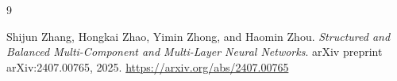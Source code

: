\documentclass[12pt]{article}
\begin{document}

\begin{thebibliography}{9}

Shijun Zhang, Hongkai Zhao, Yimin Zhong, and Haomin Zhou.
\textit{Structured and Balanced Multi-Component and Multi-Layer Neural Networks}.
arXiv preprint arXiv:2407.00765, 2025.
\url{https://arxiv.org/abs/2407.00765}

\end{thebibliography}
\end{document}
